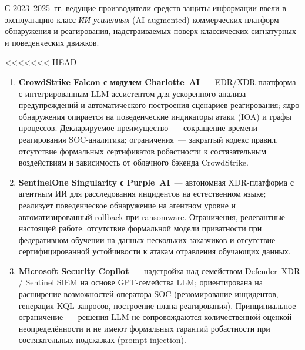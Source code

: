 \label{subsec:commercial_ai_idps}


С 2023--2025~гг. ведущие производители средств защиты информации
ввели в эксплуатацию класс \emph{ИИ-усиленных} (AI-augmented)
коммерческих платформ обнаружения и реагирования, надстраиваемых
поверх классических сигнатурных и поведенческих движков.

<<<<<<< HEAD
\begin{enumerate}[leftmargin=2em, itemsep=0pt]

\item \textbf{CrowdStrike Falcon с модулем Charlotte~AI}~---
EDR/XDR-платформа с интегрированным LLM-ассистентом для
ускоренного анализа предупреждений и автоматического построения
сценариев реагирования; ядро обнаружения опирается на
поведенческие индикаторы атаки (IOA) и графы процессов.
Декларируемое преимущество~--- сокращение времени реагирования
SOC-аналитика; ограничения~--- закрытый кодекс правил,
отсутствие формальных сертификатов робастности к состязательным
воздействиям и зависимость от облачного бэкенда CrowdStrike.

\item \textbf{SentinelOne Singularity с Purple~AI}~---
автономная XDR-платформа с агентным ИИ для расследования
инцидентов на естественном языке; реализует поведенческое
обнаружение на агентном уровне и автоматизированный rollback при
ransomware. Ограничения, релевантные настоящей работе:
отсутствие формальной модели приватности при федеративном
обучении на данных нескольких заказчиков и отсутствие
сертифицированной устойчивости к атакам отравления обучающих
данных.

\item \textbf{Microsoft Security Copilot}~--- надстройка над
семейством Defender~XDR / Sentinel SIEM на основе GPT-семейства
LLM; ориентирована на расширение возможностей оператора SOC
(резюмирование инцидентов, генерация KQL-запросов, построение
плана реагирования). Принципиальное ограничение~--- решения LLM
не сопровождаются количественной оценкой неопределённости и не
имеют формальных гарантий робастности при состязательных
подсказках (prompt-injection).


\end{enumerate}
